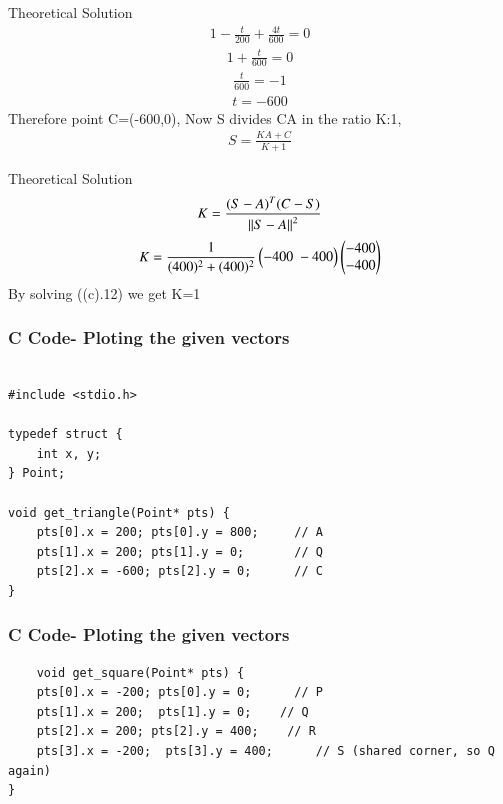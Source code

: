 \documentclass{beamer}
\begin{document}
    \begin{frame}{Theoretical Solution}
        \begin{align}
                1-\frac{t}{200}+\frac{4t}{600} = 0
            \end{align}
            \begin{align}
                1 + \frac{t}{600} = 0
            \end{align}
            \begin{align}
                \frac{t}{600}=-1
            \end{align}
            \begin{align}
                t= -600
            \end{align}
            Therefore point C=(-600,0), Now S divides CA in the ratio K:1,
            \begin{align}
                S = \frac{KA+C}{K+1}
            \end{align}
    \end{frame}
    \begin{frame}{Theoretical Solution}
            \begin{align}
                K=\frac{(S-A)^T(C-S)}{\left\lVert S-A\right\rVert^2}
            \end{align}
        \begin{align}
                K=\frac{1}{(400)^2+(400)^2}\begin{pmatrix}-400\;-400\end{pmatrix}\begin{pmatrix}-400\\-400\end{pmatrix}
            \end{align}
            By solving ((c).12) we get K=1
    \end{frame}
    
	
	\begin{frame}[fragile]
	\frametitle{C Code- Ploting the given vectors}
	
	\begin{lstlisting}

#include <stdio.h>

typedef struct {
    int x, y;
} Point;

void get_triangle(Point* pts) {
    pts[0].x = 200; pts[0].y = 800;     // A
    pts[1].x = 200; pts[1].y = 0;       // Q
    pts[2].x = -600; pts[2].y = 0;      // C
}
	\end{lstlisting}
\end{frame}
\begin{frame}[fragile]
\frametitle{C Code- Ploting the given vectors}
    \begin{lstlisting}
    void get_square(Point* pts) {
    pts[0].x = -200; pts[0].y = 0;      // P
    pts[1].x = 200;  pts[1].y = 0;    // Q
    pts[2].x = 200; pts[2].y = 400;    // R
    pts[3].x = -200;  pts[3].y = 400;      // S (shared corner, so Q again)
}

    \end{lstlisting}
\end{frame}
\end{document}
